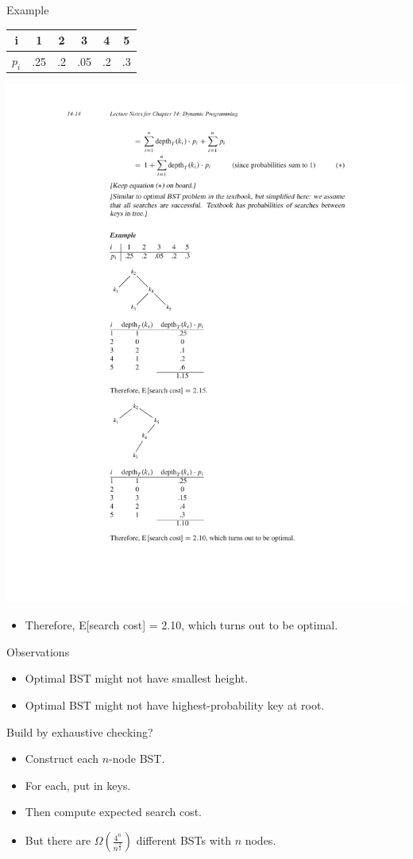 \documentclass[aspectratio=169]{beamer}
\begin{document}
\begin{frame}{Example}
    \centering
    \begin{tabular}{c | c c c c c}
        i & 1 & 2 & 3 & 4 & 5 \\
        \hline
        $p_i$ & .25 & .2 & .05 & .2 & .3
    \end{tabular}
    \includegraphics[width=\textwidth, trim={4cm 4cm 4cm 17cm}, clip]{figures/BST_example}
    \begin{itemize}
        \item Therefore, E[search cost] = 2.10, which turns out to be optimal.
    \end{itemize}
\end{frame}

\begin{frame}{Observations}
    \begin{itemize}
        \item Optimal BST might not have smallest height.
        \item Optimal BST might not have highest-probability key at root.
    \end{itemize}
    Build by exhaustive checking?
    \begin{itemize}
        \item Construct each $n$-node BST.
        \item For each, put in keys.
        \item Then compute expected search cost.
        \item But there are $\Omega \left( \frac{4^n}{n^{\frac{3}{2}}} \right)$ different BSTs with $n$ nodes.
    \end{itemize}
\end{frame}
\end{document}
